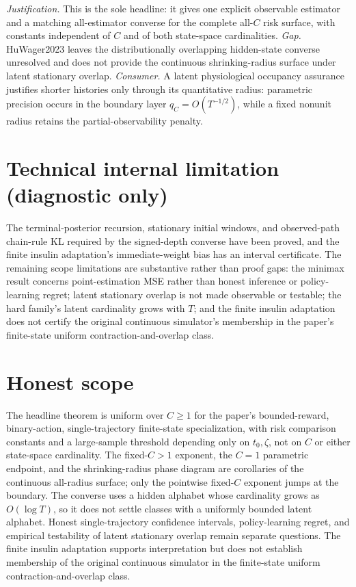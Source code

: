 \documentclass{article}
\begin{document}
\par\smallskip\noindent \textit{Justification.} This is the sole headline: it gives one explicit observable estimator and a matching all-estimator converse for the complete all-\(C\) risk surface, with constants independent of \(C\) and of both state-space cardinalities. \textit{Gap.} HuWager2023 leaves the distributionally overlapping hidden-state converse unresolved and does not provide the continuous shrinking-radius surface under latent stationary overlap. \textit{Consumer.} A latent physiological occupancy assurance justifies shorter histories only through its quantitative radius: parametric precision occurs in the boundary layer \(q_C=O(T^{-1/2})\), while a fixed nonunit radius retains the partial-observability penalty.

\section*{Technical internal limitation (diagnostic only)}

The terminal-posterior recursion, stationary initial windows, and observed-path chain-rule KL required by the signed-depth converse have been proved, and the finite insulin adaptation's immediate-weight bias has an interval certificate. The remaining scope limitations are substantive rather than proof gaps: the minimax result concerns point-estimation MSE rather than honest inference or policy-learning regret; latent stationary overlap is not made observable or testable; the hard family's latent cardinality grows with \(T\); and the finite insulin adaptation does not certify the original continuous simulator's membership in the paper's finite-state uniform contraction-and-overlap class.

\section{Honest scope}

The headline theorem is uniform over \(C\ge1\) for the paper's bounded-reward, binary-action, single-trajectory finite-state specialization, with risk comparison constants and a large-sample threshold depending only on \(t_0,\zeta\), not on \(C\) or either state-space cardinality. The fixed-\(C>1\) exponent, the \(C=1\) parametric endpoint, and the shrinking-radius phase diagram are corollaries of the continuous all-radius surface; only the pointwise fixed-\(C\) exponent jumps at the boundary. The converse uses a hidden alphabet whose cardinality grows as \(O(\log T)\), so it does not settle classes with a uniformly bounded latent alphabet. Honest single-trajectory confidence intervals, policy-learning regret, and empirical testability of latent stationary overlap remain separate questions. The finite insulin adaptation supports interpretation but does not establish membership of the original continuous simulator in the finite-state uniform contraction-and-overlap class.
\end{document}
